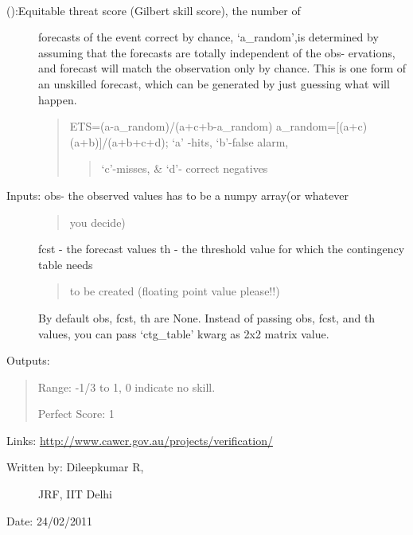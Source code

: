 \documentclass[letterpaper,10pt,english]{sphinxmanual}
\begin{document}

\begin{fulllineitems}
\label{diagnosis:ctgfunction.ets}~\begin{description}
\item[{{\hyperref[diagnosis:ctgfunction.ets]{}} ():Equitable threat score (Gilbert skill score), the number of}] \leavevmode
forecasts of the event correct by chance, `a\_random',is determined
by assuming that the forecasts are totally independent of the obs-
ervations, and forecast will match the observation only by chance.
This is one form of an unskilled forecast, which can be generated
by just guessing what will happen.
\begin{quote}

ETS=(a-a\_random)/(a+c+b-a\_random)
a\_random={[}(a+c)(a+b){]}/(a+b+c+d); `a' -hits, `b'-false alarm,
\begin{quote}

`c'-misses, \& `d'- correct negatives
\end{quote}
\end{quote}

\item[{Inputs: obs- the observed values has to be a numpy array(or whatever}] \leavevmode\begin{quote}

you decide)
\end{quote}

fcst - the forecast values
th  - the threshold value for which the contingency table needs
\begin{quote}

to be created (floating point value please!!)
\end{quote}

By default obs, fcst, th are None. Instead of passing obs, fcst,
and th values, you can pass `ctg\_table' kwarg as 2x2 matrix value.

\end{description}

Outputs:
\begin{quote}

Range: -1/3 to 1, 0 indicate no skill.

Perfect Score: 1
\end{quote}

Links: \href{http://www.cawcr.gov.au/projects/verification/}{http://www.cawcr.gov.au/projects/verification/}
\begin{description}
\item[{Written by: Dileepkumar R,}] \leavevmode
JRF, IIT Delhi

\end{description}

Date: 24/02/2011

\end{fulllineitems}
\end{document}
